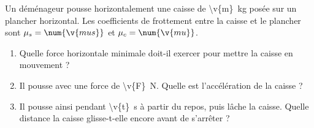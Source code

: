 Un déménageur pousse horizontalement une caisse de \qty{\v{m}}{kg} posée sur un plancher horizontal. Les coefficients de frottement entre la caisse et le plancher sont $\mu_s = \num{\v{mus}}$ et $\mu_c = \num{\v{mu}}$.

\begin{enumerate}[label=\alph*)]
    \item Quelle force horizontale minimale doit-il exercer pour mettre la caisse en mouvement ?
    \item Il pousse avec une force de \qty{\v{F}}{N}. Quelle est l'accélération de la caisse ?
    \item Il pousse ainsi pendant \qty{\v{t}}{s} à partir du repos, puis lâche la caisse. Quelle distance la caisse glisse-t-elle encore avant de s'arrêter ?
\end{enumerate}
